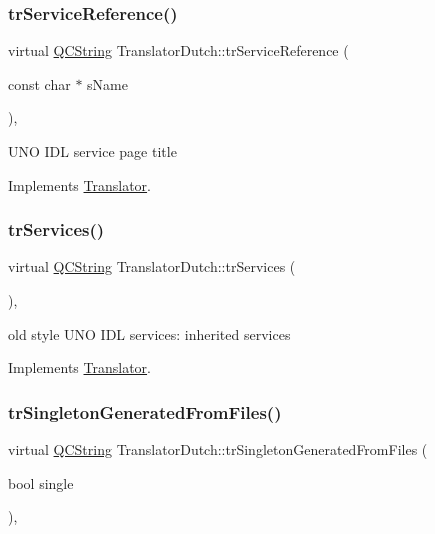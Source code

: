 \subsubsection{\texorpdfstring{trServiceReference()}{trServiceReference()}}
{\footnotesize\ttfamily virtual \mbox{\hyperlink{class_q_c_string}{Q\+C\+String}} Translator\+Dutch\+::tr\+Service\+Reference (\begin{DoxyParamCaption}\item[{const char $\ast$}]{s\+Name }\end{DoxyParamCaption})\hspace{0.3cm}{\ttfamily [inline]}, {\ttfamily [virtual]}}

U\+NO I\+DL service page title 

Implements \mbox{\hyperlink{class_translator}{Translator}}.

\mbox{\label{class_translator_dutch_a93b1c4272cba43fd09cbd3b653803ff2}} 
\subsubsection{\texorpdfstring{trServices()}{trServices()}}
{\footnotesize\ttfamily virtual \mbox{\hyperlink{class_q_c_string}{Q\+C\+String}} Translator\+Dutch\+::tr\+Services (\begin{DoxyParamCaption}{ }\end{DoxyParamCaption})\hspace{0.3cm}{\ttfamily [inline]}, {\ttfamily [virtual]}}

old style U\+NO I\+DL services\+: inherited services 

Implements \mbox{\hyperlink{class_translator}{Translator}}.

\mbox{\label{class_translator_dutch_a523139ebd2531f91c67d9043b09ae2ef}} 
\subsubsection{\texorpdfstring{trSingletonGeneratedFromFiles()}{trSingletonGeneratedFromFiles()}}
{\footnotesize\ttfamily virtual \mbox{\hyperlink{class_q_c_string}{Q\+C\+String}} Translator\+Dutch\+::tr\+Singleton\+Generated\+From\+Files (\begin{DoxyParamCaption}\item[{bool}]{single }\end{DoxyParamCaption})\hspace{0.3cm}{\ttfamily [inline]}, {\ttfamily [virtual]}}

